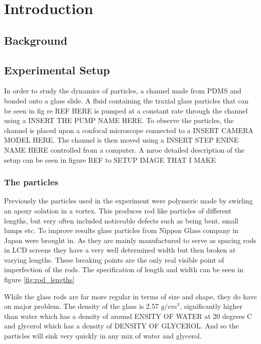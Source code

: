 \documentclass[]{report}
\title{}
\author{}
\begin{document}
\maketitle

\begin{abstract}

\end{abstract}

\chapter{Introduction}


\section{Background}
	

\section{Experimental Setup}
In order to study the dynamics of particles, a channel made from PDMS and bonded onto a glass slide. A fluid containing the traxial glass particles that can be seen in fig re REF HERE is pumped at a constant rate through the channel using a INSERT THE PUMP NAME HERE. To observe the particles, the channel is placed upon a confocal microscope connected to a INSERT CAMERA MODEL HERE. The channel is then moved using a INSERT STEP ENINE NAME HERE controlled from a computer. A mroe detailed description of the setup can be seen in figure REF to SETUP IMAGE THAT I MAKE

\subsection{The particles}
	Previously the particles used in the experiment were polymeric made by swirling an apoxy solution in a vortex. This produces rod like particles of different lengths, but very often included noticeable defects such as being bent, small lumps etc. 
	To improve results glass particles from Nippon Glass company in Japan were brought in. As they are mainly manufactured to serve as spacing rods in LCD screens they have a very well determined width but then broken at varying lengths. These breaking points are the only real visible point of imperfection of the rods.
	The specification of length and width can be seen in figure \ref{fig:rod_lengths}
	
	While the glass rods are far more regular in terms of size and shape, they do have on major problem. The density of the glass is 2.57 $g/cm^3$, significantly higher than water which has a density of around ENSITY OF WATER at 20 degrees C and glycerol which has a density of DENSITY OF GLYCEROL. And so the particles will sink very quickly in any mix of water and glycerol.
	
\end{document}
